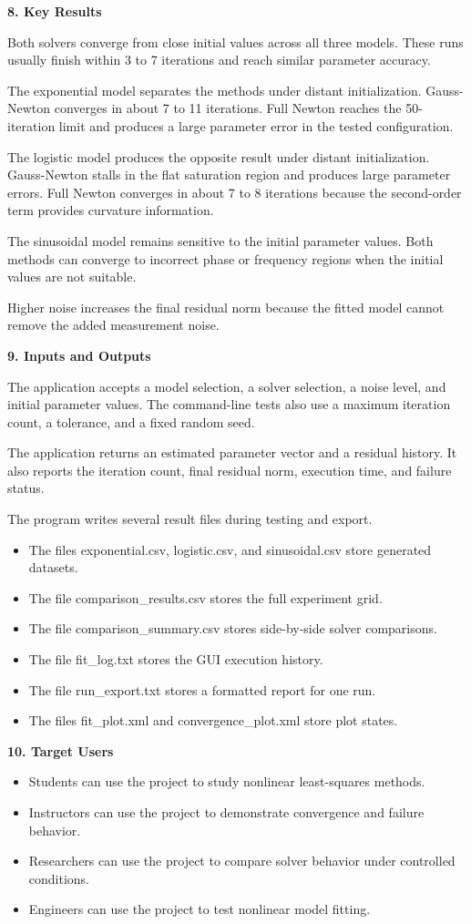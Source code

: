 \documentclass[9pt,a4paper]{extarticle}
\newcommand{\Sec}[1]{\vspace{2pt}\noindent\textbf{#1}\par\vspace{2pt}}
\begin{document}
\Sec{8. Key Results}
Both solvers converge from close initial values across all three models. These runs usually finish within 3 to 7 iterations and reach similar parameter accuracy.

The exponential model separates the methods under distant initialization. Gauss-Newton converges in about 7 to 11 iterations. Full Newton reaches the 50-iteration limit and produces a large parameter error in the tested configuration.

The logistic model produces the opposite result under distant initialization. Gauss-Newton stalls in the flat saturation region and produces large parameter errors. Full Newton converges in about 7 to 8 iterations because the second-order term provides curvature information.

The sinusoidal model remains sensitive to the initial parameter values. Both methods can converge to incorrect phase or frequency regions when the initial values are not suitable.

Higher noise increases the final residual norm because the fitted model cannot remove the added measurement noise.
\newpage

\Sec{9. Inputs and Outputs}
The application accepts a model selection, a solver selection, a noise level, and initial parameter values. The command-line tests also use a maximum iteration count, a tolerance, and a fixed random seed.

The application returns an estimated parameter vector and a residual history. It also reports the iteration count, final residual norm, execution time, and failure status.

The program writes several result files during testing and export.
\begin{itemize}
\item The files exponential.csv, logistic.csv, and sinusoidal.csv store generated datasets.
\item The file comparison\_results.csv stores the full experiment grid.
\item The file comparison\_summary.csv stores side-by-side solver comparisons.
\item The file fit\_log.txt stores the GUI execution history.
\item The file run\_export.txt stores a formatted report for one run.
\item The files fit\_plot.xml and convergence\_plot.xml store plot states.
\end{itemize}

\Sec{10. Target Users}
\begin{itemize}
\item Students can use the project to study nonlinear least-squares methods.
\item Instructors can use the project to demonstrate convergence and failure behavior.
\item Researchers can use the project to compare solver behavior under controlled conditions.
\item Engineers can use the project to test nonlinear model fitting.
\end{itemize}
\newpage
\end{document}
